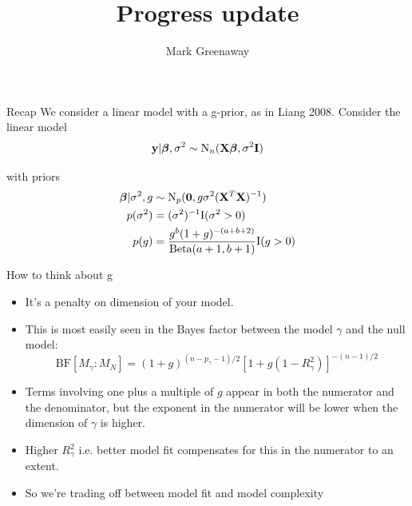 \documentclass{beamer}
\title{Progress update}
\author{Mark Greenaway}
\begin{document}
\begin{frame}
\titlepage
\end{frame}

\begin{frame}{Recap}
We consider a linear model with a g-prior, as in Liang 2008. Consider the linear model
\begin{align*}
{\bf y} | {\boldsymbol \beta}, \sigma^2 \sim \text{N}_n({\bf X} {\boldsymbol \beta}, \sigma^2 {\bf I})
\end{align*}

with priors
\begin{align*}
{\boldsymbol\beta} | \sigma^2, g &\sim \text{N}_p({\bf 0}, g \sigma^2 ({\bf X}^T {\bf X})^{-1}) \\
p(\sigma^2) &= (\sigma^2)^{-1} \text{I}(\sigma^2 > 0) \\
p(g) &= \frac{g^b (1 + g)^{-(a + b + 2)}}{\text{Beta}(a + 1, b + 1)} \text{I}(g > 0)
\end{align*}

\end{frame}

\begin{frame}{How to think about g}

\begin{itemize}
\item It's a penalty on dimension of your model.

\item This is most easily seen in the Bayes factor between the model $\gamma$ and the null model:
\begin{equation*}
\text{BF}[M_\gamma:M_N] = (1 + g)^{(n - p_\gamma - 1)/2} [1 + g(1 - R_\gamma^2)]^{-(n-1)/2}
\end{equation*}

\item Terms involving one plus a multiple of $g$ appear in both the numerator and the denominator, but the
exponent in the numerator will be lower when the dimension of $\gamma$ is higher.
\item Higher $R^2_\gamma$ i.e. better model fit compensates for this in the numerator to an extent.
\item So we're trading off between model fit and model complexity
\end{itemize}
\end{frame}
\end{document}
